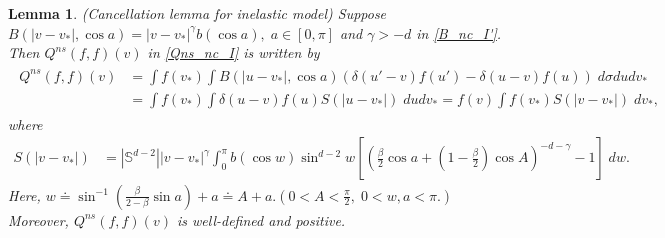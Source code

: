 \documentclass[reqno,10pt]{amsart}
\newtheorem{lemma}[theorem]{Lemma}
\numberwithin{equation}{section}
\begin{document}
\begin{lemma} (Cancellation lemma for inelastic model) \label{CC_I}
Suppose $B(|v-v_*|,\cos a)=|v-v_*|^{\gamma}b(\cos a), \;a \in [0,\pi]$ and $\gamma > -d$ in \eqref{B_nc_I'}.
Then $Q^{ns}(f,f)(v)$ in \eqref{Qns_nc_I} is written by  
\begin{align}  \label{Lemma_CC_I_equ}
\begin{split}
     Q^{ns}(f, f)(v) &= \int f(v_*)\int B(|u-v_*|, \cos a)(\delta(u'-v)f(u')-\delta(u-v)f(u)) \; d\sigma du dv_* \\&=\int f(v_*) \int \delta(u-v)f(u)S(|u-v_*|) \; du
    dv_* 
    =f(v) \int f(v_*)S(|v-v_*|) \;
    dv_*,
\end{split}
\end{align}where  
\begin{align*}
    S(|v-v_*|)
    &= |\mathbb{S}^{d-2}||v-v_*|^{\gamma}\int_0^\pi b(\cos w)\sin^{d-2}w [(\frac{\beta}{2}\cos a + (1-\frac{\beta}{2})\cos A)^{-d-\gamma}-1] \; dw.
\end{align*}
Here, $w \doteq \sin^{-1}(\frac{\beta}{2-\beta}\sin a)+a \doteq A+a.(0<A<\frac{\pi}{2},\; 0<w,a<\pi.)$
Moreover, $Q^{ns}(f,f)(v)$ is well-defined and positive. \end{lemma}
\end{document}
